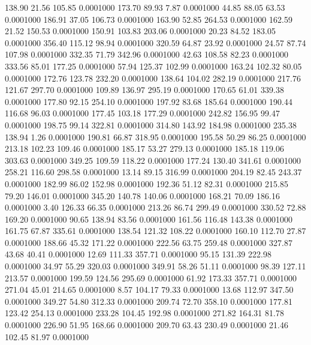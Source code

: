  138.90   21.56  105.85   0.0001000
 173.70   89.93    7.87   0.0001000
  44.85   88.05   63.53   0.0001000
 186.91   37.05  106.73   0.0001000
 163.90   52.85  264.53   0.0001000
 162.59   21.52  150.53   0.0001000
 150.91  103.83  203.06   0.0001000
  20.23   84.52  183.05   0.0001000
 356.40  115.12   98.94   0.0001000
 320.59   64.87   23.92   0.0001000
  24.57   87.74  107.98   0.0001000
 332.35   71.79  342.96   0.0001000
  42.63  108.58   82.23   0.0001000
 333.56   85.01  177.25   0.0001000
  57.94  125.37  102.99   0.0001000
 163.24  102.32   80.05   0.0001000
 172.76  123.78  232.20   0.0001000
 138.64  104.02  282.19   0.0001000
 217.76  121.67  297.70   0.0001000
 109.89  136.97  295.19   0.0001000
 170.65   61.01  339.38   0.0001000
 177.80   92.15  254.10   0.0001000
 197.92   83.68  185.64   0.0001000
 190.44  116.68   96.03   0.0001000
 177.45  103.18  177.29   0.0001000
 242.82  156.95   99.47   0.0001000
 198.75   99.14  322.81   0.0001000
 314.80  143.92  184.98   0.0001000
 235.38  138.94    1.26   0.0001000
 190.81   66.87  318.95   0.0001000
 195.58   50.29   86.25   0.0001000
 213.18  102.23  109.46   0.0001000
 185.17   53.27  279.13   0.0001000
 185.18  119.06  303.63   0.0001000
 349.25  109.59  118.22   0.0001000
 177.24  130.40  341.61   0.0001000
 258.21  116.60  298.58   0.0001000
  13.14   89.15  316.99   0.0001000
 204.19   82.45  243.37   0.0001000
 182.99   86.02  152.98   0.0001000
 192.36   51.12   82.31   0.0001000
 215.85   79.20  146.01   0.0001000
 345.20  140.78  140.06   0.0001000
 168.21   70.09  186.16   0.0001000
   3.40  126.33   66.35   0.0001000
 213.26   86.74  299.49   0.0001000
 330.52   72.88  169.20   0.0001000
  90.65  138.94   83.56   0.0001000
 161.56  116.48  143.38   0.0001000
 161.75   67.87  335.61   0.0001000
 138.54  121.32  108.22   0.0001000
 160.10  112.70   27.87   0.0001000
 188.66   45.32  171.22   0.0001000
 222.56   63.75  259.48   0.0001000
 327.87   43.68   40.41   0.0001000
  12.69  111.33  357.71   0.0001000
  95.15  131.39  222.98   0.0001000
  34.97   55.29  320.03   0.0001000
 349.91   58.26   51.11   0.0001000
  98.39  127.11  213.57   0.0001000
 199.59  124.56  295.69   0.0001000
  61.92  173.33  357.71   0.0001000
 271.04   45.01  214.65   0.0001000
   8.57  104.17   79.33   0.0001000
  13.68  112.97  347.50   0.0001000
 349.27   54.80  312.33   0.0001000
 209.74   72.70  358.10   0.0001000
 177.81  123.42  254.13   0.0001000
 233.28  104.45  192.98   0.0001000
 271.82  164.31   81.78   0.0001000
 226.90   51.95  168.66   0.0001000
 209.70   63.43  230.49   0.0001000
  21.46  102.45   81.97   0.0001000
